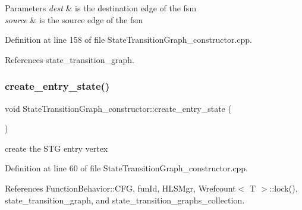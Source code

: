 \begin{DoxyParams}{Parameters}
{\em dest} & is the destination edge of the fsm \\
\hline
{\em source} & is the source edge of the fsm \\
\hline
\end{DoxyParams}


Definition at line 158 of file State\+Transition\+Graph\+\_\+constructor.\+cpp.



References state\+\_\+transition\+\_\+graph.

\mbox{\label{classStateTransitionGraph__constructor_a5bf451d9586402376ceb07442838858a}} 
\subsubsection{\texorpdfstring{create\+\_\+entry\+\_\+state()}{create\_entry\_state()}}
{\footnotesize\ttfamily void State\+Transition\+Graph\+\_\+constructor\+::create\+\_\+entry\+\_\+state (\begin{DoxyParamCaption}{ }\end{DoxyParamCaption})}



create the S\+TG entry vertex 



Definition at line 60 of file State\+Transition\+Graph\+\_\+constructor.\+cpp.



References Function\+Behavior\+::\+C\+FG, fun\+Id, H\+L\+S\+Mgr, Wrefcount$<$ T $>$\+::lock(), state\+\_\+transition\+\_\+graph, and state\+\_\+transition\+\_\+graphs\+\_\+collection.

